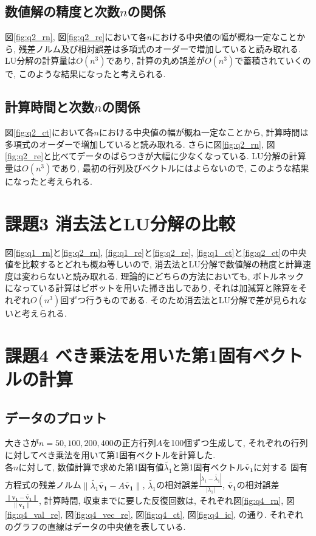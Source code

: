 \documentclass[uplatex,a4j]{jsarticle}
\begin{document}
\newpage
\subsection{数値解の精度と次数$n$の関係}
\label{sec:q2_2}
図\ref{fig:q2_rn}, 図\ref{fig:q2_re}において各$n$における中央値の幅が概ね一定なことから, 
残差ノルム及び相対誤差は多項式のオーダーで増加していると読み取れる. 
LU分解の計算量は$O(n^3)$であり, 計算の丸め誤差が$O(n^3)$で蓄積されていくので, このような結果になったと考えられる.

\subsection{計算時間と次数$n$の関係}
\label{sec:q2_3}
図\ref{fig:q2_ct}において各$n$における中央値の幅が概ね一定なことから, 
計算時間は多項式のオーダーで増加していると読み取れる. 
さらに図\ref{fig:q2_rn}, 図\ref{fig:q2_re}と比べてデータのばらつきが大幅に少なくなっている.
LU分解の計算量は$O(n^3)$であり, 最初の行列及びベクトルにはよらないので, このような結果になったと考えられる.


\section{課題3 消去法とLU分解の比較}
図\ref{fig:q1_rn}と\ref{fig:q2_rn}, \ref{fig:q1_re}と\ref{fig:q2_re}, 
\ref{fig:q1_ct}と\ref{fig:q2_ct}の中央値を比較するとどれも概ね等しいので, 
消去法とLU分解で数値解の精度と計算速度は変わらないと読み取れる. 
理論的にどちらの方法においても, ボトルネックになっている計算はピボットを用いた掃き出しであり, 
それは加減算と除算をそれぞれ$O(n^3)$回ずつ行うものである. 
そのため消去法とLU分解で差が見られないと考えられる. 

\section{課題4 べき乗法を用いた第1固有ベクトルの計算}
\label{sec:q4}

\subsection{データのプロット}
\label{sec:q4_1}
大きさが$n = 50,100,200,400$の正方行列$A$を100個ずつ生成して, 
それぞれの行列に対してべき乗法を用いて第1固有ベクトルを計算した. \\
各$n$に対して, 数値計算で求めた第1固有値$\tilde{\lambda_1}$と第1固有ベクトル$\bm{\tilde{v_1}}$に対する
固有方程式の残差ノルム$\| \tilde{\lambda_1}\bm{\tilde{v_1}} - A \bm{\tilde{v_1}} \|$, 
$\tilde{\lambda_1}$の相対誤差$\frac{|\lambda_1 - \tilde{\lambda_1}|}{|\lambda_1|}$, 
$\bm{\tilde{v_1}}$の相対誤差$\frac{\| \bm{v_1} - \bm{\tilde{v_1}} \|}{\| \bm{v_1} \|}$, 
計算時間, 収束までに要した反復回数は, 
それぞれ図\ref{fig:q4_rn}, 図\ref{fig:q4_val_re}, 図\ref{fig:q4_vec_re}, 図\ref{fig:q4_ct}, 図\ref{fig:q4_ic}, の通り. 
それぞれのグラフの直線はデータの中央値を表している.
\end{document}
